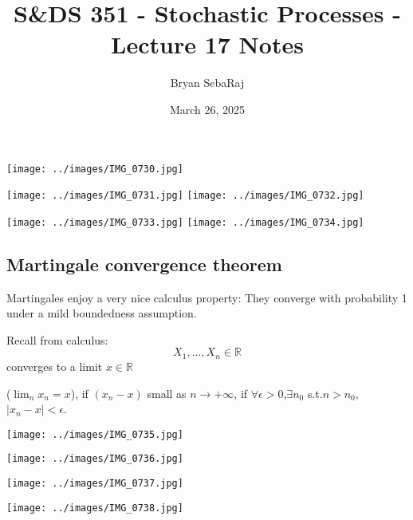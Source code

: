 \documentclass{article}
\title{S\&DS 351 - Stochastic Processes - Lecture 17 Notes}
\author{Bryan SebaRaj}
\date{March 26, 2025}
\begin{document}
\maketitle


\texttt{[image: ../images/IMG\_0730.jpg]}

\texttt{[image: ../images/IMG\_0731.jpg]}
\texttt{[image: ../images/IMG\_0732.jpg]}

\texttt{[image: ../images/IMG\_0733.jpg]}
\texttt{[image: ../images/IMG\_0734.jpg]}


\subsection*{Martingale convergence theorem}

Martingales enjoy a very nice calculus property: They converge with probability
1 under a mild boundedness assumption.

Recall from calculus: 
$$X_1, ..., X_n \in \mathbb{R}$$
converges to a limit $x\in \mathbb{R}$

\noindent ($\lim_n x_n=x$), if $(x_n-x)$ small as $n\rightarrow +\infty$, if $\forall \epsilon>0$,$\exists n_0$ s.t.$n>n_0$, $|x_n-x|<\epsilon$.

\texttt{[image: ../images/IMG\_0735.jpg]}

\texttt{[image: ../images/IMG\_0736.jpg]}

\texttt{[image: ../images/IMG\_0737.jpg]}

\texttt{[image: ../images/IMG\_0738.jpg]}
\end{document}

